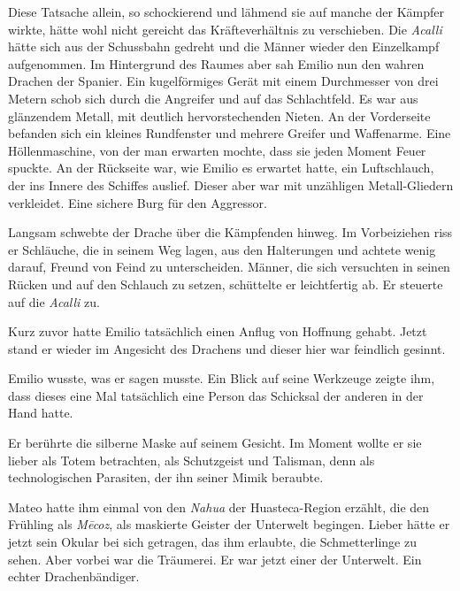 Diese Tatsache allein, so schockierend und lähmend sie auf manche
der Kämpfer wirkte, hätte wohl nicht gereicht das Kräfteverhältnis
zu verschieben. Die \textit{Acalli} hätte sich aus der Schussbahn gedreht
und die Männer wieder den Einzelkampf aufgenommen. Im Hintergrund
des Raumes aber sah Emilio nun den wahren Drachen der Spanier. Ein
kugelförmiges Gerät mit einem Durchmesser von drei Metern schob
sich durch die Angreifer und auf das Schlachtfeld. Es war aus
glänzendem Metall, mit deutlich hervorstechenden Nieten. An der
Vorderseite befanden sich ein kleines Rundfenster und mehrere
Greifer und Waffenarme. Eine Höllenmaschine, von der man erwarten
mochte, dass sie jeden Moment Feuer spuckte. An der Rückseite war,
wie Emilio es erwartet hatte, ein Luftschlauch, der ins Innere des
Schiffes auslief. Dieser aber war mit unzähligen Metall-Gliedern
verkleidet. Eine sichere Burg für den Aggressor.

Langsam schwebte der Drache über die Kämpfenden hinweg. Im
Vorbeiziehen riss er Schläuche, die in seinem Weg lagen, aus den
Halterungen und achtete wenig darauf, Freund von Feind zu
unterscheiden. Männer, die sich versuchten in seinen Rücken und auf
den Schlauch zu setzen, schüttelte er leichtfertig ab. Er steuerte
auf die \textit{Acalli} zu.

\bigpar

Kurz zuvor hatte Emilio tatsächlich einen Anflug von Hoffnung
gehabt. Jetzt stand er wieder im Angesicht des Drachens und dieser
hier war feindlich gesinnt.

 Emilio wusste, was er sagen musste.
Ein Blick auf seine Werkzeuge zeigte ihm, dass dieses eine Mal
tatsächlich eine Person das Schicksal der anderen in der Hand
hatte.

Er berührte die silberne Maske auf seinem Gesicht. Im Moment wollte
er sie lieber als Totem betrachten, als Schutzgeist und Talisman,
denn als technologischen Parasiten, der ihn seiner Mimik beraubte.

Mateo hatte ihm einmal von den \textit{Nahua} der Huasteca-Region erzählt,
die den Frühling als \textit{M\=ecoz}, als maskierte Geister der Unterwelt
begingen. Lieber hätte er jetzt sein Okular bei sich getragen, das
ihm erlaubte, die Schmetterlinge zu sehen. Aber vorbei war die
Träumerei. Er war jetzt einer der Unterwelt. Ein echter
Drachenbändiger.

